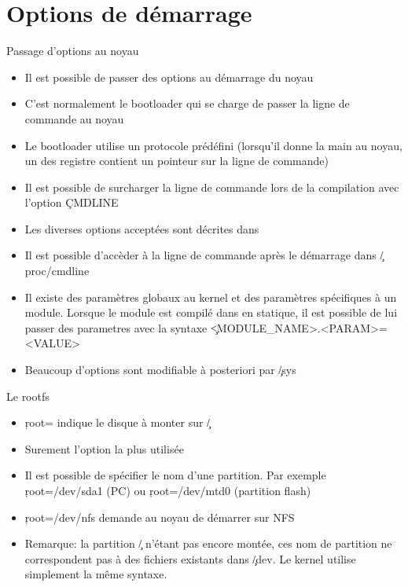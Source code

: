 \section{Options de démarrage}
\begin{frame}[fragile=singleslide]{Passage d'options au noyau}
  \begin{itemize} 
  \item Il est possible de passer des options au démarrage du noyau
  \item C'est  normalement le bootloader  qui se charge de  passer la
    ligne de commande au noyau
  \item Le bootloader utilise  un protocole prédéfini (lorsqu'il donne
    la  main au noyau,  un des  registre contient  un pointeur  sur la
    ligne de commande)
  \item Il est possible de surcharger  la ligne de commande lors de la
    compilation avec l'option \c{CMDLINE}
  \item   Les   diverses   options   acceptées   sont   décrites   dans
  \item  Il est possible  d'accèder à  la ligne  de commande  après le
    démarrage dans \c{/proc/cmdline}
  \item Il existe  des paramètres globaux au kernel  et des paramètres
    spécifiques à  un module.  Lorsque le module  est compilé  dans en
    statique, il  est possible  de lui passer  des parametres  avec la
    syntaxe \c{<MODULE_NAME>.<PARAM>=<VALUE>}
  \item Beaucoup d'options sont modifiable à posteriori par \c{/sys}
  \end{itemize} 
\end{frame} 

\begin{frame}[fragile=singleslide]{Le rootfs}
  \begin{itemize}
  \item \c{root=} indique le disque  à monter sur \c{/}
  \item Surement l'option la plus utilisée
  \item  Il est  possible de  spécifier  le nom  d'une partition.  Par
    exemple  \c{root=/dev/sda1} (PC) ou  \c{root=/dev/mtd0} (partition
    flash)
  \item \c{root=/dev/nfs} demande au noyau de démarrer sur NFS
  \item Remarque:  la partition \c{/}  n'étant pas encore  montée, ces
    nom  de partition ne  correspondent pas  à des  fichiers existants
    dans \c{/dev}. Le kernel utilise simplement la même syntaxe.
  \end{itemize} 
\end{frame} 

